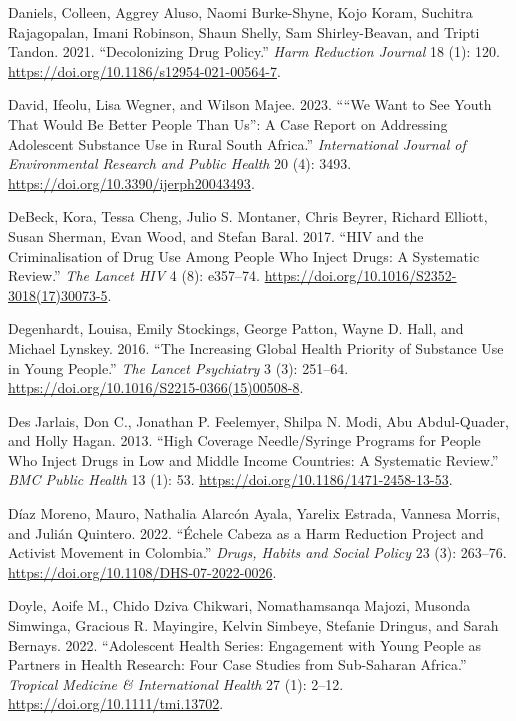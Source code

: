 \documentclass[
  letterpaper,
  DIV=11,
  numbers=noendperiod]{scrartcl}
\newlength{\cslhangindent}
\newenvironment{CSLReferences}[2] %
 {\begin{list}{}{%
  \setlength{\itemindent}{0pt}
  \setlength{\leftmargin}{0pt}
  \setlength{\parsep}{0pt}
  \ifodd #1
   \setlength{\leftmargin}{\cslhangindent}
   \setlength{\itemindent}{-1\cslhangindent}
  \fi
  \setlength{\itemsep}{#2\baselineskip}}}
 {\end{list}}
\begin{document}
\begin{CSLReferences}{1}{0}
Daniels, Colleen, Aggrey Aluso, Naomi Burke-Shyne, Kojo Koram, Suchitra
Rajagopalan, Imani Robinson, Shaun Shelly, Sam Shirley-Beavan, and
Tripti Tandon. 2021. {``Decolonizing Drug Policy.''} \emph{Harm
Reduction Journal} 18 (1): 120.
\url{https://doi.org/10.1186/s12954-021-00564-7}.

David, Ifeolu, Lisa Wegner, and Wilson Majee. 2023. {``{``}We Want to
See Youth That Would Be Better People Than Us{''}: A Case Report on
Addressing Adolescent Substance Use in Rural South Africa.''}
\emph{International Journal of Environmental Research and Public Health}
20 (4): 3493. \url{https://doi.org/10.3390/ijerph20043493}.

DeBeck, Kora, Tessa Cheng, Julio S. Montaner, Chris Beyrer, Richard
Elliott, Susan Sherman, Evan Wood, and Stefan Baral. 2017. {``HIV and
the Criminalisation of Drug Use Among People Who Inject Drugs: A
Systematic Review.''} \emph{The Lancet HIV} 4 (8): e357--74.
\url{https://doi.org/10.1016/S2352-3018(17)30073-5}.

Degenhardt, Louisa, Emily Stockings, George Patton, Wayne D. Hall, and
Michael Lynskey. 2016. {``The Increasing Global Health Priority of
Substance Use in Young People.''} \emph{The Lancet Psychiatry} 3 (3):
251--64. \url{https://doi.org/10.1016/S2215-0366(15)00508-8}.

Des Jarlais, Don C., Jonathan P. Feelemyer, Shilpa N. Modi, Abu
Abdul-Quader, and Holly Hagan. 2013. {``High Coverage Needle/Syringe
Programs for People Who Inject Drugs in Low and Middle Income Countries:
A Systematic Review.''} \emph{BMC Public Health} 13 (1): 53.
\url{https://doi.org/10.1186/1471-2458-13-53}.

Díaz Moreno, Mauro, Nathalia Alarcón Ayala, Yarelix Estrada, Vannesa
Morris, and Julián Quintero. 2022. {``Échele Cabeza as a Harm Reduction
Project and Activist Movement in Colombia.''} \emph{Drugs, Habits and
Social Policy} 23 (3): 263--76.
\url{https://doi.org/10.1108/DHS-07-2022-0026}.

Doyle, Aoife M., Chido Dziva Chikwari, Nomathamsanqa Majozi, Musonda
Simwinga, Gracious R. Mayingire, Kelvin Simbeye, Stefanie Dringus, and
Sarah Bernays. 2022. {``Adolescent Health Series: Engagement with Young
People as Partners in Health Research: Four Case Studies from
Sub-Saharan Africa.''} \emph{Tropical Medicine \& International Health}
27 (1): 2--12. \url{https://doi.org/10.1111/tmi.13702}.


\end{CSLReferences}
\end{document}
